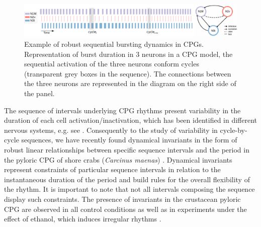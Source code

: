 \begin{figure}
	\includegraphics[width=\textwidth]{img/invariants/variability/sequences_in_cpgs.pdf}
	\caption{Example of robust sequential bursting dynamics in CPGs. Representation of burst duration in 3 neurons in a CPG model, the sequential activation of the three neurons conform cycles (transparent grey boxes in the sequence). The connections between the three neurons are represented in the diagram on the right side of the panel.}
	\label{fig:sequences_in_cpgs}
	
\end{figure}


The sequence of intervals underlying CPG rhythms present variability in the duration of each cell activation/inactivation, which has been identified in different nervous systems, e.g. see \cite{reyes_artificial_2008,elliott_temporal_1991,martinez_short-term_2019}. Consequently to the study of variability in cycle-by-cycle sequences, we have recently found dynamical invariants in the form of robust linear relationships between specific sequence intervals and the period in the  pyloric CPG of shore crabs (\textit{Carcinus maenas}) \cite{elices_robust_2019}. Dynamical invariants represent constraints of particular sequence intervals in relation to the instantaneous duration of the period and build rules for the overall flexibility of the rhythm. It is important to note that not all intervals composing the sequence display such constraints. The presence of invariants in the crustacean pyloric CPG are observed in all control conditions as well as in experiments under the effect of ethanol, which induces irregular rhythms \cite{elices_robust_2019}. 



